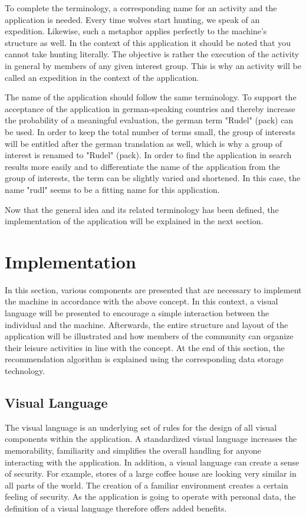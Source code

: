 \documentclass[12pt,numbers=noenddot,parskip,bibliography=totocnumbered,listof=totocnumbered,draft]{scrreprt}
\begin{document}
To complete the terminology, a corresponding name for an activity and the application is needed. Every time wolves start hunting, we speak of an expedition. Likewise, such a metaphor applies perfectly to the machine's structure as well. In the context of this application it should be noted that you cannot take hunting literally. The objective is rather the execution of the activity in general by members of any given interest group. This is why an activity will be called an expedition in the context of the application. 

The name of the application should follow the same terminology. To support the acceptance of the application in german-speaking countries and thereby increase the probability of a meaningful evaluation, the german term "Rudel" (pack) can be used. In order to keep the total number of terms small, the group of interests will be entitled after the german translation as well, which is why a group of interest is renamed to "Rudel" (pack). In order to find the application in search results more easily and to differentiate the name of the application from the group of interests, the term can be slightly varied and shortened. In this case, the name "rudl" seems to be a fitting name for this application.

Now that the general idea and its related terminology has been defined, the implementation of the application will be explained in the next section.

\section{Implementation}
In this section, various components are presented that are necessary to implement the machine in accordance with the above concept. In this context, a visual language will be presented to encourage a simple interaction between the individual and the machine. Afterwards, the entire structure and layout of the application will be illustrated and how members of the community can organize their leisure activities in line with the concept. At the end of this section, the recommendation algorithm is explained using the corresponding data storage technology.

\subsection{Visual Language} 
The visual language is an underlying set of rules for the design of all visual components within the application. A standardized visual language increases the memorability, familiarity and simplifies the overall handling for anyone interacting with the application. In addition, a visual language can create a sense of security. For example, stores of a large coffee house are looking very similar in all parts of the world. The creation of a familiar environment creates a certain feeling of security. As the application is going to operate with personal data, the definition of a visual language therefore offers added benefits.
\end{document}
